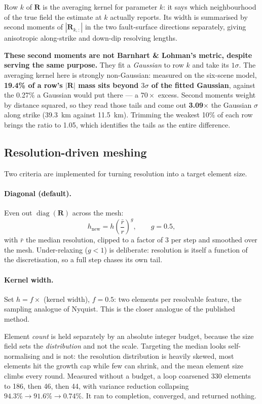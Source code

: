 \documentclass[11pt,a4paper]{article}
\newcommand{\R}{\mathbf{R}}
\newcommand{\note}[1]{\textcolor{red!60!black}{\textbf{#1}}}
\begin{document}
Row $k$ of $\R$ is the averaging kernel for parameter $k$: it says which
neighbourhood of the true field the estimate at $k$ actually reports. Its width
is summarised by second moments of $|\R_{k,:}|$ in the two fault-surface
directions separately, giving anisotropic along-strike and down-dip resolving
lengths.

\note{These second moments are not Barnhart \& Lohman's metric, despite serving
the same purpose.} They fit a \emph{Gaussian} to row $k$ and take its
$1\sigma$. The averaging kernel here is strongly non-Gaussian: measured on the
six-scene model, \textbf{19.4\% of a row's $|\R|$ mass sits beyond $3\sigma$ of
the fitted Gaussian}, against the 0.27\% a Gaussian would put there --- a
$70\times$ excess. Second moments weight by distance squared, so they read those
tails and come out \textbf{3.09$\times$} the Gaussian $\sigma$ along strike
(39.3~km against 11.5~km). Trimming the weakest 10\% of each row brings the ratio
to 1.05, which identifies the tails as the entire difference.

\subsection{Resolution-driven meshing}

Two criteria are implemented for turning resolution into a target element size.

\paragraph{Diagonal (default).} Even out $\operatorname{diag}(\R)$ across the mesh:
\begin{equation}
h_{\text{new}} = h \left(\frac{\bar{r}}{r}\right)^{g},
\qquad g = 0.5,
\end{equation}
with $\bar{r}$ the median resolution, clipped to a factor of 3 per step and
smoothed over the mesh. Under-relaxing ($g<1$) is deliberate: resolution is itself
a function of the discretisation, so a full step chases its own tail.

\paragraph{Kernel width.} Set $h = f \times$ (kernel width), $f = 0.5$: two
elements per resolvable feature, the sampling analogue of Nyquist. This is the
closer analogue of the published method.

Element \emph{count} is held separately by an absolute integer budget, because
the size field sets the \emph{distribution} and not the scale. Targeting the
median looks self-normalising and is not: the resolution distribution is heavily
skewed, most elements hit the growth cap while few can shrink, and the mean
element size climbs every round. Measured without a budget, a loop coarsened 330
elements to 186, then 46, then 44, with variance reduction collapsing
$94.3\% \to 91.6\% \to \mathbf{0.74\%}$. It ran to completion, converged, and
returned nothing.
\end{document}
